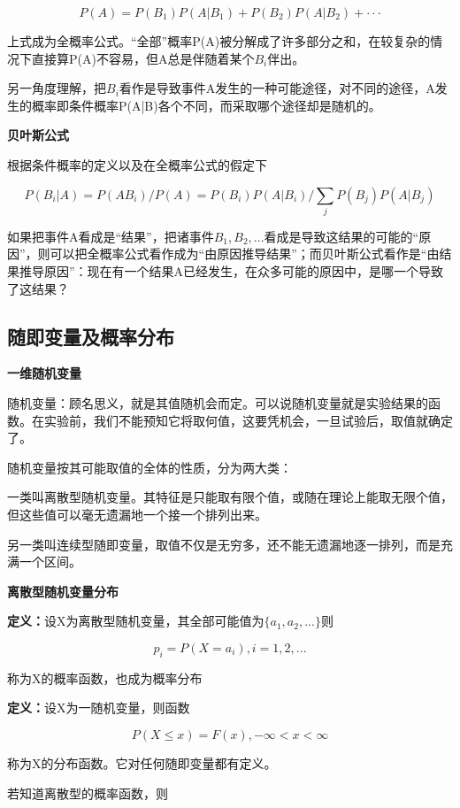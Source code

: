 \documentclass{ctexart}
\begin{document}
	\[P(A)=P(B_1)P(A|B_1)+P(B_2)P(A|B_2)+···\]
	
	上式成为全概率公式。“全部”概率P(A)被分解成了许多部分之和，在较复杂的情况下直接算P(A)不容易，但A总是伴随着某个\(B_i\)伴出。
	
	另一角度理解，把\(B_i\)看作是导致事件A发生的一种可能途径，对不同的途径，A发生的概率即条件概率P(A|B)各个不同，而采取哪个途径却是随机的。
	
	\mbox{}
	
	\textbf{贝叶斯公式}
	
	根据条件概率的定义以及在全概率公式的假定下
	
	\[P(B_i|A)=P(AB_i)/P(A)=P(B_i)P(A|B_i)/\sum_{j}P(B_j)P(A|B_j)\]
	
	如果把事件A看成是“结果”，把诸事件\(B_1,B_2,...\)看成是导致这结果的可能的“原因”，则可以把全概率公式看作成为“由原因推导结果”；而贝叶斯公式看作是“由结果推导原因”：现在有一个结果A已经发生，在众多可能的原因中，是哪一个导致了这结果？
	
	\subsection{随即变量及概率分布}
	
	\textbf{一维随机变量}
	
	随机变量：顾名思义，就是其值随机会而定。可以说随机变量就是实验结果的函数。在实验前，我们不能预知它将取何值，这要凭机会，一旦试验后，取值就确定了。
	
	随机变量按其可能取值的全体的性质，分为两大类：
	
	一类叫离散型随机变量。{\color{red}其特征是只能取有限个值，或随在理论上能取无限个值，但这些值可以毫无遗漏地一个接一个排列出来。}
	
	另一类叫连续型随即变量，取值不仅是无穷多，{\color{red}还不能无遗漏地逐一排列，而是充满一个区间}。
	
	\mbox{}
	
	\textbf{离散型随机变量分布}
	
	\textbf{定义：}设X为离散型随机变量，其全部可能值为\(\{a_1,a_2,...\}\)则
	
	\[p_i=P(X=a_i), i =1,2,...\]
	
	称为X的概率函数，也成为概率分布
	
	\textbf{定义：}设X为一随机变量，则函数
	
	\[P(X \leq x)=F(x), -\infty < x < \infty\]
	
	称为X的分布函数。它对任何随即变量都有定义。
	
	若知道离散型的概率函数，则
	
\end{document}
